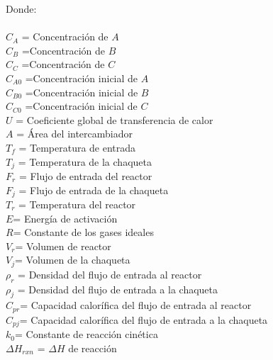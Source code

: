     Donde:

\begin{multicols}{2}
\paragraph{}

$C_A $ = Concentración de $A$\\
$C_B $ =Concentración de $B$\\
$C_C $ =Concentración de $C$\\
$C_{A0} $ =Concentración inicial de $A$\\
$C_{B0} $ =Concentración inicial de $B$\\
$C_{C0} $ =Concentración inicial de $C$\\
$U$ = Coeficiente global de transferencia de calor \\
$A$ = Área del intercambiador\\
$T_f$ = Temperatura de entrada\\
$T_j $ = Temperatura de la chaqueta\\
$F_r$ =  Flujo de entrada del reactor\\
$F_j$ =  Flujo de entrada  de la chaqueta\\
$ T_r $ =  Temperatura del reactor\\
$E $= Energía de activación\\
$R $= Constante de los gases ideales\\
$V_r $= Volumen de reactor\\
$V_j $= Volumen de la chaqueta\\
$ \rho_r $ = Densidad del flujo  de entrada al reactor\\
$ \rho_j $ = Densidad del flujo  de entrada a la chaqueta\\
$C_{pr}$= Capacidad calorífica del flujo de entrada al reactor\\
$C_{pj}$= Capacidad calorífica del flujo de entrada a la chaqueta\\
$ k_0$= Constante de reacción cinética \\
$\Delta H_{rxn}$ =  $\Delta H$ de reacción

\end{multicols}
